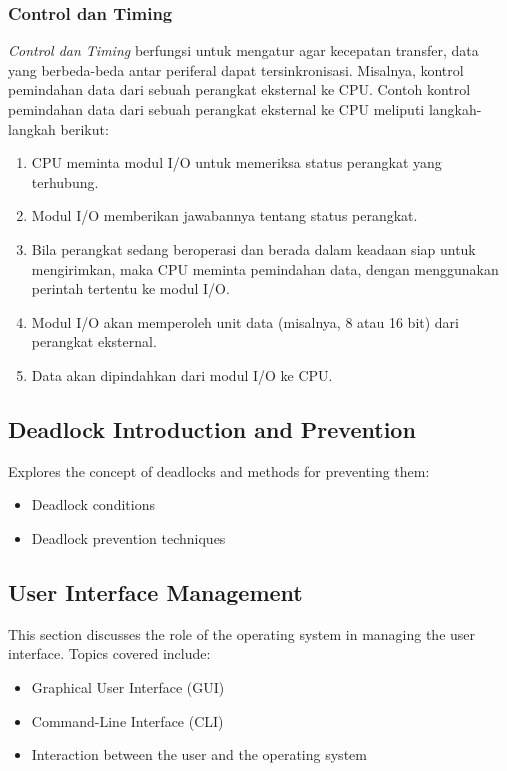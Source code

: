 \documentclass[12pt]{article}
\begin{document}
\subsubsection{Control dan Timing} 
\textit{Control dan Timing} berfungsi untuk mengatur agar kecepatan transfer, data yang berbeda-beda antar periferal dapat tersinkronisasi. Misalnya, kontrol pemindahan data dari sebuah perangkat eksternal ke CPU. Contoh kontrol pemindahan data dari sebuah perangkat eksternal ke CPU meliputi langkah-langkah berikut: 
\begin{enumerate} 
    \item CPU meminta modul I/O untuk memeriksa status perangkat yang terhubung. 
    \item Modul I/O memberikan jawabannya tentang status perangkat. 
    \item Bila perangkat sedang beroperasi dan berada dalam keadaan siap untuk mengirimkan, maka CPU meminta pemindahan data, dengan menggunakan perintah tertentu ke modul I/O. \item Modul I/O akan memperoleh unit data (misalnya, 8 atau 16 bit) dari perangkat eksternal. 
    \item Data akan dipindahkan dari modul I/O ke CPU. 
\end{enumerate}

\subsection{Deadlock Introduction and Prevention}
Explores the concept of deadlocks and methods for preventing them:
\begin{itemize}
    \item Deadlock conditions
    \item Deadlock prevention techniques
\end{itemize}

\subsection{User Interface Management}
This section discusses the role of the operating system in managing the user interface. Topics covered include:
\begin{itemize}
    \item Graphical User Interface (GUI)
    \item Command-Line Interface (CLI)
    \item Interaction between the user and the operating system
\end{itemize}
\end{document}
